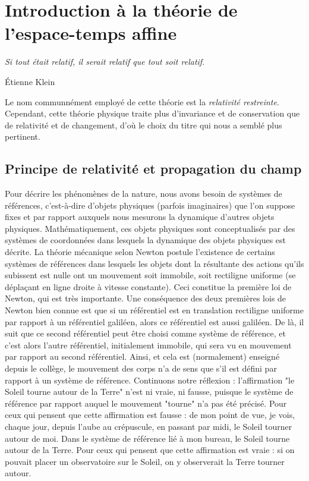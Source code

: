 
\chapter{Introduction à la théorie de l'espace-temps affine}

\epigraphfontsize{\small\itshape}
\epigraph{\textit{Si tout était relatif, il serait relatif que tout soit relatif.}}{ Étienne Klein}
	
	Le nom communnément employé de cette théorie est la \emph{relativité restreinte}. Cependant, cette théorie physique traite plus d'invariance et de conservation que de relativité et de changement, d'où le choix du titre qui nous a semblé plus pertinent.

	\section{Principe de relativité et propagation du champ}
		Pour décrire les phénomènes de la nature, nous avons besoin de systèmes de références, c'est-à-dire d'objets physiques (parfois imaginaires) que l'on suppose fixes et par rapport auxquels nous mesurons la dynamique d'autres objets physiques. Mathématiquement, ces objets physiques sont conceptualisés par des systèmes de coordonnées dans lesquels la dynamique des objets physiques est décrite. La théorie mécanique selon Newton postule l'existence de certains systèmes de références dans lesquels les objets dont la résultante des actions qu'ils subissent est nulle ont un mouvement soit immobile, soit rectiligne uniforme (se déplaçant en ligne droite à vitesse constante). Ceci constitue la première loi de Newton, qui est très importante. Une conséquence des deux premières lois de Newton bien connue est que si un référentiel est en translation rectiligne uniforme par rapport à un référentiel galiléen, alors ce référentiel est aussi galiléen. De là, il suit que ce second référentiel peut être choisi comme système de référence, et c'est alors l'autre référentiel, initialement immobile, qui sera vu en mouvement par rapport au second référentiel. Ainsi, et cela est (normalement) enseigné depuis le collège, le mouvement des corps n'a de sens que s'il est défini par rapport à un système de référence. Continuons notre réflexion : l'affirmation "le Soleil tourne autour de la Terre" n'est ni vraie, ni fausse, puisque le système de référence par rapport auquel le mouvement "tourne" n'a pas été précisé. Pour ceux qui pensent que cette affirmation est fausse : de mon point de vue, je vois, chaque jour, depuis l'aube au crépuscule, en passant par midi, le Soleil tourner autour de moi. Dans le système de référence lié à mon bureau, le Soleil tourne autour de la Terre. Pour ceux qui pensent que cette affirmation est vraie : si on pouvait placer un observatoire sur le Soleil, on y observerait la Terre tourner autour.

